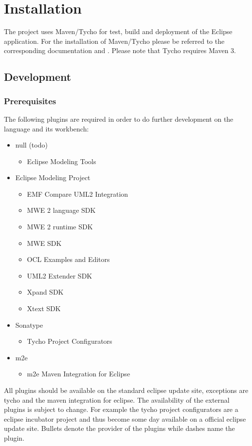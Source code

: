 \section{Installation}
The project uses Maven/Tycho for test, build and deployment of the Eclipse 
application. For the installation of Maven/Tycho please be referred to the 
corresponding documentation \cite{tycho} and \cite{maven}. Please note that 
Tycho requires Maven 3.

\subsection{Development}
\subsubsection{Prerequisites}
The following plugins are required in order to do further development on the 
language and its workbench: 
\begin{itemize}
  \item null (todo)
  \begin{itemize}
    \item Eclipse Modeling Tools
  \end{itemize}
  \item Eclipse Modeling Project
  \begin{itemize}
    \item EMF Compare UML2 Integration
    \item MWE 2 language SDK
    \item MWE 2 runtime SDK
    \item MWE SDK
    \item OCL Examples and Editors
    \item UML2 Extender SDK
    \item Xpand SDK
    \item Xtext SDK
  \end{itemize}
  \item Sonatype
  \begin{itemize}
    \item Tycho Project Configurators
  \end{itemize}
  \item m2e
  \begin{itemize}
    \item m2e Maven Integration for Eclipse
  \end{itemize}
\end{itemize} 
All plugins should be available on the standard eclipse update site, exceptions
are tycho and the maven integration for eclipse. The availability of the 
external plugins is subject to change. For example the tycho project 
configurators are a eclipse incubator project and thus become some day available
on a official eclipse update site. Bullets denote the provider of the plugins
while dashes name the plugin.

